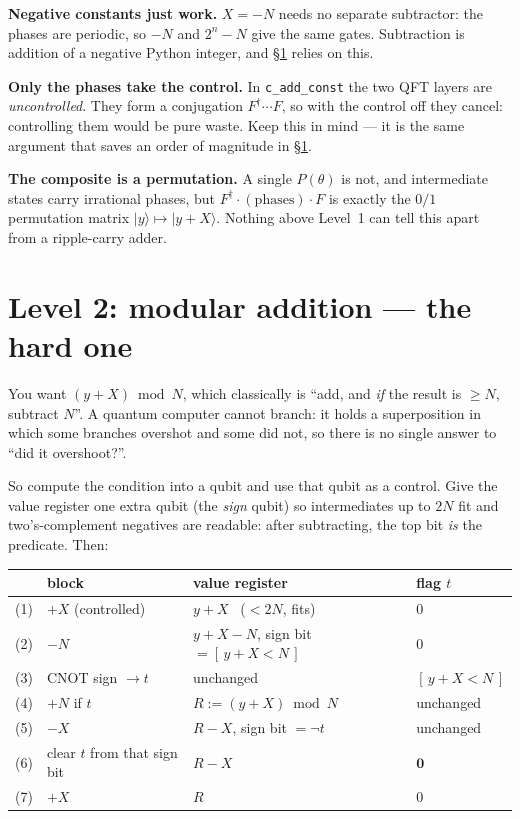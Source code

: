 \documentclass[11pt]{article}
\renewcommand{\ket}[1]{\lvert #1 \rangle}
\newcommand{\code}[1]{\texttt{#1}}
\theoremstyle{plain}
\theoremstyle{remark}
\begin{document}
\begin{keybox}[title={Three things to notice}]
\textbf{Negative constants just work.} $X=-N$ needs no separate subtractor: the phases are
periodic, so $-N$ and $2^{n}-N$ give the same gates. Subtraction is addition of a negative Python
integer, and \S\ref{im:sec:l2} relies on this.

\textbf{Only the phases take the control.} In \code{c\_add\_const} the two QFT layers are
\emph{uncontrolled}. They form a conjugation $F^\dagger\cdots F$, so with the control off they
cancel: controlling them would be pure waste. Keep this in mind --- it is the same argument that
saves an order of magnitude in \S\ref{im:sec:l2}.

\textbf{The composite is a permutation.} A single $P(\theta)$ is not, and intermediate states carry
irrational phases, but $F^\dagger\cdot(\text{phases})\cdot F$ is exactly the $0/1$ permutation
matrix $\ket y\mapsto\ket{y+X}$. Nothing above Level~1 can tell this apart from a ripple-carry
adder.
\end{keybox}

\section{Level 2: modular addition --- the hard one}\label{im:sec:l2}

You want $(y+X)\bmod N$, which classically is ``add, and \emph{if} the result is $\ge N$, subtract
$N$''. A quantum computer cannot branch: it holds a superposition in which some branches overshot
and some did not, so there is no single answer to ``did it overshoot?''.

So compute the condition into a qubit and use that qubit as a control. Give the value register one
extra qubit (the \emph{sign} qubit) so intermediates up to $2N$ fit and two's-complement negatives
are readable: after subtracting, the top bit \emph{is} the predicate. Then:

\begin{center}\small
\begin{tabular}{@{}rlll@{}}
\toprule
& block & value register & flag $t$\\
\midrule
(1) & $+X$ (controlled) & $y+X$ \ ($<2N$, fits) & $0$\\
(2) & $-N$ & $y+X-N$, sign bit $=[\,y+X<N\,]$ & $0$\\
(3) & CNOT sign $\to t$ & unchanged & $[\,y+X<N\,]$\\
(4) & $+N$ if $t$ & $R:=(y+X)\bmod N$ & unchanged\\
\midrule
(5) & $-X$ & $R-X$, sign bit $=\neg t$ & unchanged\\
(6) & clear $t$ from that sign bit & $R-X$ & $\mathbf 0$\\
(7) & $+X$ & $R$ & $0$\\
\bottomrule
\end{tabular}
\end{center}
\end{document}
